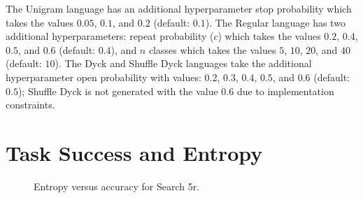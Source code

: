 The Unigram language has an additional hyperparameter stop probability which takes the values $0.05$, $0.1$, and $0.2$ (default: $0.1$).
The Regular language has two additional hyperparameters: repeat probability ($c$) which takes the values $0.2$, $0.4$, $0.5$, and $0.6$ (default: $0.4$), and $n$ classes which takes the values $5$, $10$, $20$, and $40$ (default: $10$).
The Dyck and Shuffle Dyck languages take the additional hyperparameter open probability with values: $0.2$, $0.3$, $0.4$, $0.5$, and $0.6$ (default: $0.5$); Shuffle Dyck is not generated with the value $0.6$ due to implementation constraints.

\section{Task Success and Entropy}
\unskip\label{hpo:sec:ent-vs-acc}
\begin{figure}
  \centering
  \caption{Entropy versus accuracy for Search 5r.}
  \unskip\label{hpo:fig:ent-vs-acc}
\end{figure}

